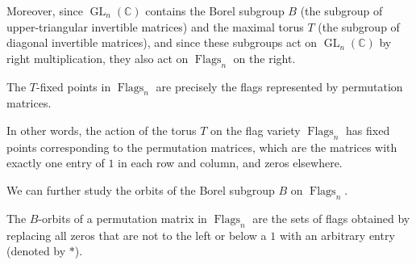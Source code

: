 Moreover, since \(\operatorname{GL}_n(\mathbb{C})\) contains the Borel subgroup \(B\) (the subgroup of upper-triangular invertible matrices) and the maximal torus \(T\) (the subgroup of diagonal invertible matrices), and since these subgroups act on \(\operatorname{GL}_n(\mathbb{C})\) by right multiplication, they also act on \(\operatorname{Flags}_n\) on the right.

\begin{proposition}
    The \(T\)-fixed points in \(\operatorname{Flags}_n\) are precisely the flags represented by permutation matrices.
\end{proposition}

In other words, the action of the torus \(T\) on the flag variety \(\operatorname{Flags}_n\) has fixed points corresponding to the permutation matrices, which are the matrices with exactly one entry of \(1\) in each row and column, and zeros elsewhere.

We can further study the orbits of the Borel subgroup \(B\) on \(\operatorname{Flags}_n\).

\begin{proposition}
    The \(B\)-orbits of a permutation matrix in \(\operatorname{Flags}_n\) are the sets of flags obtained by replacing all zeros that are not to the left or below a \(1\) with an arbitrary entry (denoted by \(\ast\)).
\end{proposition}

